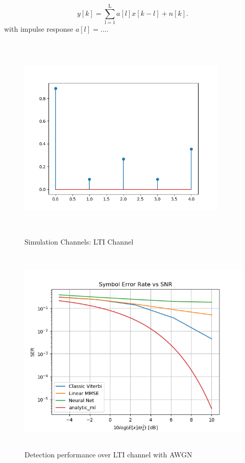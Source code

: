 \documentclass[12pt,a4paper]{article}
\begin{document}
\begin{equation*}
y[k] = \sum_{\mathrm{l=1}}^{\mathrm{L}} a[l]x[k-l] + n[k].
\end{equation*}
with impulse response $a[l] = ...$.
\begin{figure}[H]
\centering
	\includegraphics[width=10cm,height = 10cm]{system_model/lti_channel}
		  \caption{Simulation Channels: LTI Channel}
	  \label{fig:LTI Channel}
\end{figure}

\begin{figure}[H]
	\includegraphics[width=\textwidth,height = 10cm]{results/lti_normal}
		  \caption{Detection performance over LTI channel with AWGN}

	  \label{fig:LTI performance}
\end{figure}
\end{document}
